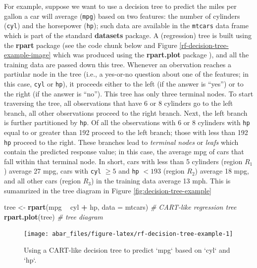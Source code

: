 \documentclass[]{book}
\newenvironment{Shaded}{\begin{snugshade}}{\end{snugshade}}
\newcommand{\CommentTok}[1]{\textcolor[rgb]{0.56,0.35,0.01}{\textit{#1}}}
\newcommand{\DataTypeTok}[1]{\textcolor[rgb]{0.13,0.29,0.53}{#1}}
\newcommand{\KeywordTok}[1]{\textcolor[rgb]{0.13,0.29,0.53}{\textbf{#1}}}
\newcommand{\NormalTok}[1]{#1}
\newcommand{\OperatorTok}[1]{\textcolor[rgb]{0.81,0.36,0.00}{\textbf{#1}}}
\newcommand{\StringTok}[1]{\textcolor[rgb]{0.31,0.60,0.02}{#1}}
\theoremstyle{definition}
\theoremstyle{definition}
\theoremstyle{definition}
\theoremstyle{remark}
\begin{document}
For example, suppose we want to use a decision tree to predict the miles
per gallon a car will average (\texttt{mpg}) based on two features: the
number of cylinders (\texttt{cyl}) and the horsepower (\texttt{hp});
such data are available in the \texttt{mtcars} data frame which is part
of the standard \textbf{datasets} package. A (regression) tree is built
using the \textbf{rpart} package \citep{R-rpart} (see the code chunk
below and Figure \ref{rf-decision-tree-example-image} which was produced
using the \textbf{rpart.plot} package \citep{R-rpart.plot}), and all the
training data are passed down this tree. Whenever an obervation reaches
a partiular node in the tree (i.e., a yes-or-no question about one of
the features; in this case, \texttt{cyl} or \texttt{hp}), it proceeds
either to the left (if the answer is ``yes'') or to the right (if the
answer is ``no''). This tree has only three terminal nodes. To start
traversing the tree, all observations that have 6 or 8 cylinders go to
the left branch, all other observations proceed to the right branch.
Next, the left branch is further partitioned by \texttt{hp}. Of all the
observations with 6 or 8 cylinders with \texttt{hp} equal to or greater
than 192 proceed to the left branch; those with less than 192
\texttt{hp} proceed to the right. These branches lead to \emph{terminal
nodes} or \emph{leafs} which contain the predicted response value; in
this case, the average mpg of cars that fall within that terminal node.
In short, cars with less than 5 cylinders (region \(R_1\)) average 27
mpg, cars with \texttt{cyl} \(\ge 5\) and \texttt{hp} \(< 193\) (region
\(R_2\)) average 18 mpg, and all other cars (region \(R_3\)) in the
training data average 13 mph. This is sumamrized in the tree diagram in
Figure \ref{fig:decision-tree-example}

\begin{Shaded}
\begin{Highlighting}[]
\NormalTok{tree <-}\StringTok{ }\KeywordTok{rpart}\NormalTok{(mpg }\OperatorTok{~}\StringTok{ }\NormalTok{cyl }\OperatorTok{+}\StringTok{ }\NormalTok{hp, }\DataTypeTok{data =}\NormalTok{ mtcars)  }\CommentTok{# CART-like regression tree}
\KeywordTok{rpart.plot}\NormalTok{(tree)  }\CommentTok{# tree diagram}
\end{Highlighting}
\end{Shaded}

\begin{figure}

{\centering \texttt{[image: abar\_files/figure-latex/rf-decision-tree-example-1]} 

}

\caption{Using a CART-like decision tree to predict `mpg` based on `cyl` and `hp`.}\label{fig:rf-decision-tree-example}
\end{figure}
\end{document}
